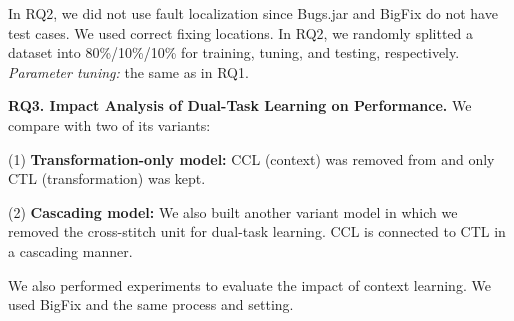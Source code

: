 
In RQ2, we did not use fault localization since Bugs.jar and
BigFix do not have test cases. We used correct fixing locations.  In
RQ2, we randomly splitted a dataset into
80\%/10\%/10\% for training, tuning, and testing,
respectively.
{\em Parameter tuning:} the same as in RQ1.






\vspace{2pt}
{\bf RQ3. Impact Analysis of Dual-Task Learning on Performance.}
We compare {\tool} with two of its variants:

(1) \textbf{Transformation-only model:}
CCL (context) was removed from {\tool} and only CTL (transformation)
was kept.


(2) \textbf{Cascading model:} We also built another variant model in
which we removed the cross-stitch unit for dual-task learning. CCL is
connected to CTL in a cascading manner.

We also performed experiments to evaluate the impact of context
learning. We used BigFix and the same process and setting.


